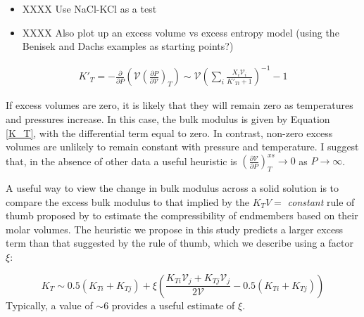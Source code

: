 \begin{itemize}
\item XXXX Use NaCl-KCl as a test
\item XXXX Also plot up an excess volume vs excess entropy model (using the Benisek and Dachs examples as starting points?)
\end{itemize}

\begin{eqnarray}
  K'_{T} = -\frac{\partial}{\partial P} \left (\mathcal{V}\left( \frac{\partial P}{\partial \mathcal{V}} \right)_T \right) \sim \mathcal{V} \left(\sum_i \frac{X_i \mathcal{V}_i}{K'_{Ti} + 1} \right)^{-1} - 1
\end{eqnarray}

If excess volumes are zero, it is likely that they will remain zero as temperatures and pressures increase. In this case, the bulk modulus is given by Equation \ref{K_T}, with the differential term equal to zero. In contrast, non-zero excess volumes are unlikely to remain constant with pressure and temperature. I suggest that, in the absence of other data a useful heuristic is $\left( \frac{\partial \mathcal{V}}{\partial P} \right)_T^{xs} \rightarrow 0$ as $P \rightarrow \infty$.

A useful way to view the change in bulk modulus across a solid solution is to compare the excess bulk modulus to that implied by the $K_TV =$ \emph{constant} rule of thumb proposed by \cite{AA1970} to estimate the compressibility of endmembers based on their molar volumes. The heuristic we propose in this study predicts a larger excess term than that suggested by the rule of thumb, which we describe using a factor $\xi$:

\begin{equation}
  K_{T} \sim 0.5(K_{Ti} + K_{Tj}) + \xi \left(\frac{K_{Ti}\mathcal{V}_{j} + K_{Tj}\mathcal{V}_{j}}{2 \mathcal{V}} - 0.5(K_{Ti} + K_{Tj})\right)
  \label{K_T_heuristic}
\end{equation}
\noindent Typically, a value of $\sim$6 provides a useful estimate of $\xi$.


